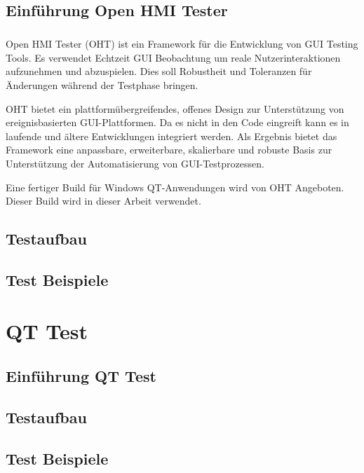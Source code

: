 		\section{Einführung Open HMI Tester}
		\paragraph{} Open HMI Tester (OHT) ist ein Framework für die Entwicklung von GUI Testing Tools. Es verwendet Echtzeit GUI Beobachtung um reale Nutzerinteraktionen aufzunehmen und abzuspielen. Dies soll Robustheit und Toleranzen für Änderungen während der Testphase bringen.
		
		OHT bietet ein plattformübergreifendes, offenes Design zur Unterstützung von ereignisbasierten GUI-Plattformen. Da es nicht in den Code eingreift kann es in laufende und ältere Entwicklungen integriert werden. Als Ergebnis bietet das Framework eine anpassbare, erweiterbare, skalierbare und robuste Basis zur Unterstützung der Automatisierung von GUI-Testprozessen.
		
		Eine fertiger Build für Windows QT-Anwendungen wird von OHT Angeboten. Dieser Build wird in dieser Arbeit verwendet.
		
		\section{Testaufbau}
		\section{Test Beispiele}
		
\chapter{QT Test}
		
		\section{Einführung QT Test}
		\section{Testaufbau}
		\section{Test Beispiele}
		
